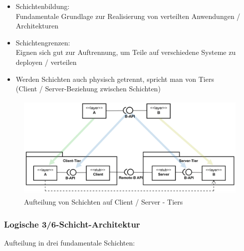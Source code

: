 \documentclass[a4paper]{article}
\begin{document}
					\begin{itemize}
						\item Schichtenbildung:\\ 
						Fundamentale Grundlage zur Realisierung von verteilten Anwendungen / Architekturen
						\item Schichtengrenzen:\\ 
						Eignen sich gut zur Auftrennung, um Teile auf verschiedene Systeme zu deployen / verteilen
						\item Werden Schichten auch physisch getrennt, spricht man von Tiers\\
						(Client / Server-Beziehung zwischen Schichten)
					\end{itemize}
				
					\begin{figure}[!htb]
						\centering
						\includegraphics[keepaspectratio, height=5cm]{img/architecture/tiers.png}
						\caption{Aufteilung von Schichten auf Client / Server - Tiers}
						\label{fig:tiers}
					\end{figure}
			
			\newpage
			
			\subsubsection{Logische 3/6-Schicht-Architektur}
			
			Aufteilung in drei fundamentale Schichten:
			
\end{document}
